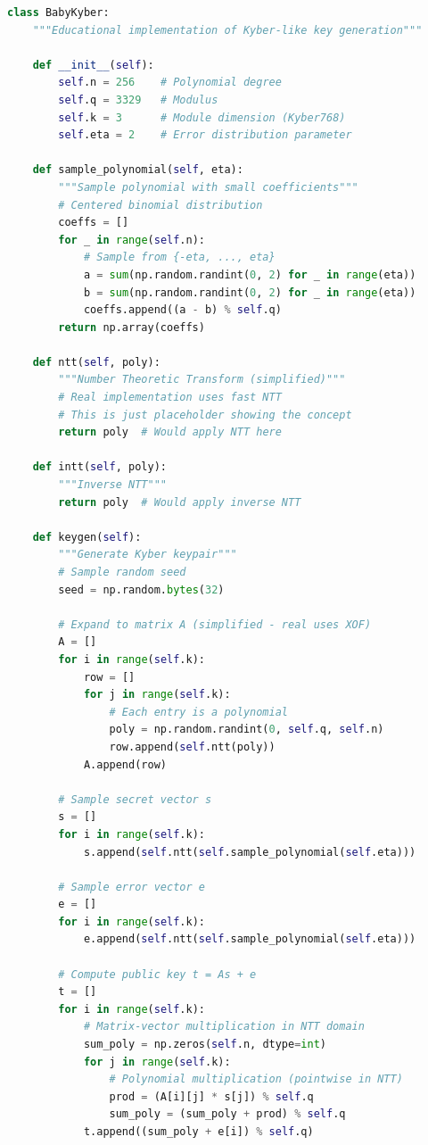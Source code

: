 \documentclass[11pt,a4paper]{article}
\begin{document}
\begin{lstlisting}[language=Python, caption=Simplified Kyber Key Generation]
class BabyKyber:
    """Educational implementation of Kyber-like key generation"""
    
    def __init__(self):
        self.n = 256    # Polynomial degree
        self.q = 3329   # Modulus
        self.k = 3      # Module dimension (Kyber768)
        self.eta = 2    # Error distribution parameter
        
    def sample_polynomial(self, eta):
        """Sample polynomial with small coefficients"""
        # Centered binomial distribution
        coeffs = []
        for _ in range(self.n):
            # Sample from {-eta, ..., eta}
            a = sum(np.random.randint(0, 2) for _ in range(eta))
            b = sum(np.random.randint(0, 2) for _ in range(eta))
            coeffs.append((a - b) % self.q)
        return np.array(coeffs)
    
    def ntt(self, poly):
        """Number Theoretic Transform (simplified)"""
        # Real implementation uses fast NTT
        # This is just placeholder showing the concept
        return poly  # Would apply NTT here
    
    def intt(self, poly):
        """Inverse NTT"""
        return poly  # Would apply inverse NTT
    
    def keygen(self):
        """Generate Kyber keypair"""
        # Sample random seed
        seed = np.random.bytes(32)
        
        # Expand to matrix A (simplified - real uses XOF)
        A = []
        for i in range(self.k):
            row = []
            for j in range(self.k):
                # Each entry is a polynomial
                poly = np.random.randint(0, self.q, self.n)
                row.append(self.ntt(poly))
            A.append(row)
        
        # Sample secret vector s
        s = []
        for i in range(self.k):
            s.append(self.ntt(self.sample_polynomial(self.eta)))
        
        # Sample error vector e
        e = []
        for i in range(self.k):
            e.append(self.ntt(self.sample_polynomial(self.eta)))
        
        # Compute public key t = As + e
        t = []
        for i in range(self.k):
            # Matrix-vector multiplication in NTT domain
            sum_poly = np.zeros(self.n, dtype=int)
            for j in range(self.k):
                # Polynomial multiplication (pointwise in NTT)
                prod = (A[i][j] * s[j]) % self.q
                sum_poly = (sum_poly + prod) % self.q
            t.append((sum_poly + e[i]) % self.q)
        

\end{lstlisting}
\end{document}
